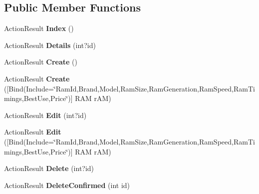 \subsection*{Public Member Functions}
\begin{DoxyCompactItemize}
\item 
Action\+Result {\bfseries Index} ()\hypertarget{class_p_c_builder_m_v_c_1_1_controllers_1_1_r_a_m_controller_ab5f0288624ca2c326259e9224b2dfdf3}{}\label{class_p_c_builder_m_v_c_1_1_controllers_1_1_r_a_m_controller_ab5f0288624ca2c326259e9224b2dfdf3}

\item 
Action\+Result {\bfseries Details} (int?id)\hypertarget{class_p_c_builder_m_v_c_1_1_controllers_1_1_r_a_m_controller_a565ca84426d8a94125ff0ba785b41141}{}\label{class_p_c_builder_m_v_c_1_1_controllers_1_1_r_a_m_controller_a565ca84426d8a94125ff0ba785b41141}

\item 
Action\+Result {\bfseries Create} ()\hypertarget{class_p_c_builder_m_v_c_1_1_controllers_1_1_r_a_m_controller_a893128c612df2fafac1d8562317965f0}{}\label{class_p_c_builder_m_v_c_1_1_controllers_1_1_r_a_m_controller_a893128c612df2fafac1d8562317965f0}

\item 
Action\+Result {\bfseries Create} (\mbox{[}Bind(Include=\char`\"{}Ram\+Id,Brand,Model,Ram\+Size,Ram\+Generation,Ram\+Speed,Ram\+Timings,Best\+Use,Price\char`\"{})\mbox{]} R\+AM r\+AM)\hypertarget{class_p_c_builder_m_v_c_1_1_controllers_1_1_r_a_m_controller_af78cd8b7deadb2481e69f886a6b7ef8d}{}\label{class_p_c_builder_m_v_c_1_1_controllers_1_1_r_a_m_controller_af78cd8b7deadb2481e69f886a6b7ef8d}

\item 
Action\+Result {\bfseries Edit} (int?id)\hypertarget{class_p_c_builder_m_v_c_1_1_controllers_1_1_r_a_m_controller_a78e10f8249868635dcfa1f0683330b44}{}\label{class_p_c_builder_m_v_c_1_1_controllers_1_1_r_a_m_controller_a78e10f8249868635dcfa1f0683330b44}

\item 
Action\+Result {\bfseries Edit} (\mbox{[}Bind(Include=\char`\"{}Ram\+Id,Brand,Model,Ram\+Size,Ram\+Generation,Ram\+Speed,Ram\+Timings,Best\+Use,Price\char`\"{})\mbox{]} R\+AM r\+AM)\hypertarget{class_p_c_builder_m_v_c_1_1_controllers_1_1_r_a_m_controller_ae754b5e8f84669b8c05909c0571e7e10}{}\label{class_p_c_builder_m_v_c_1_1_controllers_1_1_r_a_m_controller_ae754b5e8f84669b8c05909c0571e7e10}

\item 
Action\+Result {\bfseries Delete} (int?id)\hypertarget{class_p_c_builder_m_v_c_1_1_controllers_1_1_r_a_m_controller_a2f5ad983c778bfa1bf98f733fc28bc9e}{}\label{class_p_c_builder_m_v_c_1_1_controllers_1_1_r_a_m_controller_a2f5ad983c778bfa1bf98f733fc28bc9e}

\item 
Action\+Result {\bfseries Delete\+Confirmed} (int id)\hypertarget{class_p_c_builder_m_v_c_1_1_controllers_1_1_r_a_m_controller_a2d3ebd51384824c662b8f0a3b32db293}{}\label{class_p_c_builder_m_v_c_1_1_controllers_1_1_r_a_m_controller_a2d3ebd51384824c662b8f0a3b32db293}

\end{DoxyCompactItemize}
